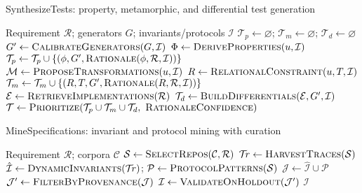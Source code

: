 \documentclass[10pt,twocolumn]{article}
\begin{document}
\vspace{0.5em}
\begin{algorithm}[ht]
\caption{SynthesizeTests: property, metamorphic, and differential test generation}
\label{alg:synth}
\small
\begin{algorithmic}[1]
\Require Requirement $\mathcal{R}$; generators $G$; invariants/protocols $\mathcal{I}$
\State $\mathcal{T}_p \gets \varnothing$; $\mathcal{T}_m \gets \varnothing$; $\mathcal{T}_d \gets \varnothing$
\State $G' \gets \textsc{CalibrateGenerators}(G,\mathcal{I})$ 
  \State $\Phi \gets \textsc{DeriveProperties}(u,\mathcal{I})$ 
  \For{$\phi \in \Phi$}
     \State $\mathcal{T}_p \gets \mathcal{T}_p \cup \{(\phi, G', \textsc{Rationale}(\phi,\mathcal{R},\mathcal{I}))\}$
  \EndFor
  \State $\mathcal{M} \gets \textsc{ProposeTransformations}(u,\mathcal{I})$ 
     \State $R \gets \textsc{RelationalConstraint}(u,T,\mathcal{I})$
     \State $\mathcal{T}_m \gets \mathcal{T}_m \cup \{(R,T,G',\textsc{Rationale}(R,\mathcal{R},\mathcal{I}))\}$
  \EndFor
\EndFor
{}
  \State $\mathcal{E} \gets \textsc{RetrieveImplementations}(\mathcal{R})$ 
  \State $\mathcal{T}_d \gets \textsc{BuildDifferentials}(\mathcal{E},G',\mathcal{I})$
\EndIf
\State \Return $\mathcal{T} \gets \textsc{Prioritize}(\mathcal{T}_p \cup \mathcal{T}_m \cup \mathcal{T}_d,\ \textsc{RationaleConfidence})$
\end{algorithmic}
\end{algorithm}
\vspace{0.5em}

\vspace{0.5em}
\begin{algorithm}[ht]
\caption{MineSpecifications: invariant and protocol mining with curation}
\label{alg:mine}
\small
\begin{algorithmic}[1]
\Require Requirement $\mathcal{R}$; corpora $\mathcal{C}$
\State $\mathcal{S} \gets \textsc{SelectRepos}(\mathcal{C}, \mathcal{R})$ 
\State $\mathcal{T}\!r \gets \textsc{HarvestTraces}(\mathcal{S})$ 
\State $\hat{\mathcal{I}} \gets \textsc{DynamicInvariants}(\mathcal{T}\!r)$; $\mathcal{P} \gets \textsc{ProtocolPatterns}(\mathcal{S})$
\State $\mathcal{J} \gets \hat{\mathcal{I}} \cup \mathcal{P}$ 
\State $\mathcal{J}' \gets \textsc{FilterByProvenance}(\mathcal{J})$ 
\State $\mathcal{I} \gets \textsc{ValidateOnHoldout}(\mathcal{J}')$ 
\State \Return $\mathcal{I}$
\end{algorithmic}
\end{algorithm}
\vspace{0.5em}
\end{document}
